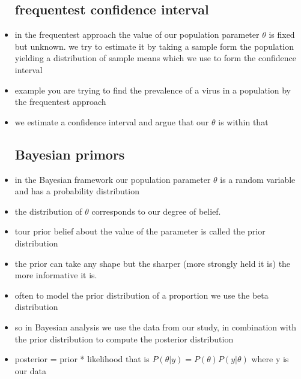 \documentclass{article}
\begin{document}
\begin{itemize}
\subsection{frequentest confidence interval }
\item in the frequentest approach the value of our population parameter $\theta$ is fixed but unknown. we try to estimate it by taking a sample form the population yielding a distribution of sample means which we use to form the confidence interval
\item example you are trying to find the prevalence of a virus in a population by the frequentest approach
\item we estimate a confidence interval and argue that our $\theta$ is within that 

\subsection{Bayesian  primors}
\item in the Bayesian framework our population parameter $\theta$ is a random variable and has a probability distribution 
\item the distribution of $\theta$ corresponds to our degree of belief. 
\item tour prior belief about the value of the parameter is called the prior distribution 
\item the prior can take any shape but the sharper (more strongly held it is) the more informative it is. 
\item often to model the prior distribution of a proportion we use the beta distribution
\item so in Bayesian analysis we use the data from our study, in combination with the prior distribution to compute the posterior distribution 
\item posterior = prior * likelihood that is $P(\theta|y)=P(\theta)P(y|\theta)$ where y is our data 

\end{itemize}
\end{document}
